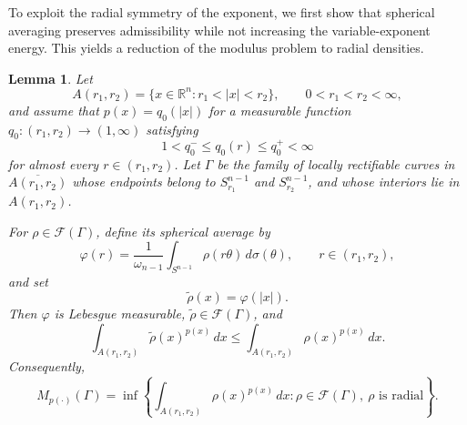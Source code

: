 \documentclass[12pt]{amsart}
\numberwithin{equation}{section}
\theoremstyle{plain}
\newtheorem{lemma}[equation]{Lemma}
\theoremstyle{definition}
\begin{document}
To exploit the radial symmetry of the exponent, we first show that
spherical averaging preserves admissibility while not increasing the
variable-exponent energy. This yields a reduction of the modulus problem
to radial densities.
\begin{lemma}
\label{lem:radial_suffices}
Let
\begin{equation*}
A(r_1,r_2)
=
\{x\in\mathbb R^n:r_1<|x|<r_2\},
\qquad
0<r_1<r_2<\infty,
\end{equation*}
and assume that
$p(x)=q_0(|x|)$
for a measurable function
$q_0:(r_1,r_2)\longrightarrow(1,\infty)$
satisfying
\begin{equation}
\label{eq:annulus_exp_bounds}
1<q_0^-\le q_0(r)\le q_0^+<\infty
\end{equation}
for almost every $r\in(r_1,r_2)$.
Let $\Gamma$ be the family of locally rectifiable curves in
$\overline{A(r_1,r_2)}$ whose endpoints belong to
$S_{r_1}^{n-1}$ and $S_{r_2}^{n-1}$, and whose interiors
lie in $A(r_1,r_2)$.

For $\rho\in\mathcal F(\Gamma)$, define its spherical average by
\begin{equation}
\label{eq:spherical_average}
\varphi(r)
=
\frac{1}{\omega_{n-1}}
\int_{S^{n-1}}
\rho(r\theta)\,d\sigma(\theta),
\qquad
r\in(r_1,r_2),
\end{equation}
and set
\begin{equation}
\label{eq:radial_average_density}
\widetilde\rho(x)
=
\varphi(|x|).
\end{equation}
Then $\varphi$ is Lebesgue measurable,
$\widetilde\rho\in\mathcal F(\Gamma)$, and
\begin{equation}
\label{eq:radial_energy_reduction}
\int_{A(r_1,r_2)}
\widetilde\rho(x)^{p(x)}\,dx
\le
\int_{A(r_1,r_2)}
\rho(x)^{p(x)}\,dx.
\end{equation}
Consequently,
\begin{equation}
\label{eq:radial_infimum}
M_{p(\cdot)}(\Gamma)
=
\inf\left\{
\int_{A(r_1,r_2)}
\rho(x)^{p(x)}\,dx:
\rho\in\mathcal F(\Gamma),
\ \rho\text{ is radial}
\right\}.
\end{equation}
\end{lemma}
\end{document}
